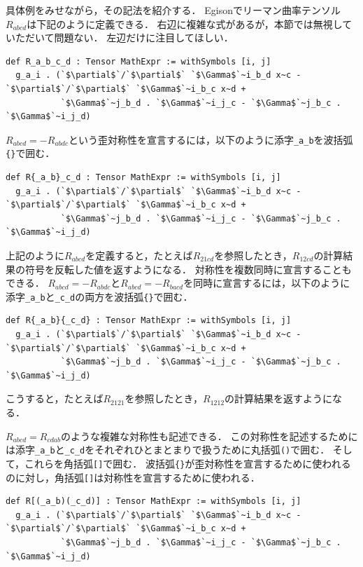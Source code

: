具体例をみせながら，その記法を紹介する．
Egisonでリーマン曲率テンソル$R_{abcd}$は下記のように定義できる．
右辺に複雑な式があるが，本節では無視していただいて問題ない．
左辺だけに注目してほしい．
\begin{lstlisting}[language=egison,numbers=none]
def R_a_b_c_d : Tensor MathExpr := withSymbols [i, j]
  g_a_i . (`$\partial$`/`$\partial$` `$\Gamma$`~i_b_d x~c - `$\partial$`/`$\partial$` `$\Gamma$`~i_b_c x~d +
           `$\Gamma$`~j_b_d . `$\Gamma$`~i_j_c - `$\Gamma$`~j_b_c . `$\Gamma$`~i_j_d)
\end{lstlisting}
$R_{abcd} = -R_{abdc}$という歪対称性を宣言するには，以下のように添字\lstinline{_a_b}を波括弧\lstinline|{}|で囲む．
\begin{lstlisting}[language=egison,numbers=none]
def R{_a_b}_c_d : Tensor MathExpr := withSymbols [i, j]
  g_a_i . (`$\partial$`/`$\partial$` `$\Gamma$`~i_b_d x~c - `$\partial$`/`$\partial$` `$\Gamma$`~i_b_c x~d +
           `$\Gamma$`~j_b_d . `$\Gamma$`~i_j_c - `$\Gamma$`~j_b_c . `$\Gamma$`~i_j_d)
\end{lstlisting}
上記のように$R_{abcd}$を定義すると，たとえば$R_{21cd}$を参照したとき，$R_{12cd}$の計算結果の符号を反転した値を返すようになる．
対称性を複数同時に宣言することもできる．
$R_{abcd} = -R_{abdc}$と$R_{abcd} = -R_{bacd}$を同時に宣言するには，以下のように添字\lstinline{_a_b}と\lstinline{_c_d}の両方を波括弧\lstinline|{}|で囲む．
\begin{lstlisting}[language=egison,numbers=none]
def R{_a_b}{_c_d} : Tensor MathExpr := withSymbols [i, j]
  g_a_i . (`$\partial$`/`$\partial$` `$\Gamma$`~i_b_d x~c - `$\partial$`/`$\partial$` `$\Gamma$`~i_b_c x~d +
           `$\Gamma$`~j_b_d . `$\Gamma$`~i_j_c - `$\Gamma$`~j_b_c . `$\Gamma$`~i_j_d)
\end{lstlisting}
こうすると，たとえば$R_{2121}$を参照したとき，$R_{1212}$の計算結果を返すようになる．

$R_{abcd} = R_{cdab}$のような複雑な対称性も記述できる．
この対称性を記述するためには添字\lstinline{_a_b}と\lstinline{_c_d}をそれぞれひとまとまりで扱うために丸括弧\lstinline{()}で囲む．
そして，これらを角括弧\lstinline|[]|で囲む．
波括弧\lstinline|{}|が歪対称性を宣言するために使われるのに対し，角括弧\lstinline|[]|は対称性を宣言するために使われる．
\begin{lstlisting}[language=egison,numbers=none]
def R[(_a_b)(_c_d)] : Tensor MathExpr := withSymbols [i, j]
  g_a_i . (`$\partial$`/`$\partial$` `$\Gamma$`~i_b_d x~c - `$\partial$`/`$\partial$` `$\Gamma$`~i_b_c x~d +
           `$\Gamma$`~j_b_d . `$\Gamma$`~i_j_c - `$\Gamma$`~j_b_c . `$\Gamma$`~i_j_d)
\end{lstlisting}

